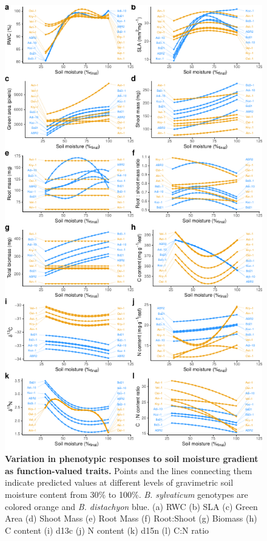\documentclass[jou,floatsintext]{apa6}
\begin{document}
\begin{figure}[!h]
\includegraphics[width=\textwidth]{../Figures/curves_byspecies} \caption{\textbf{Variation in phenotypic responses to soil moisture gradient as function-valued traits.} Points and the lines connecting them indicate predicted values at different levels of gravimetric soil moisture content from 30\% to 100\%. \emph{B. sylvaticum} genotypes are colored orange and \emph{B. distachyon} blue. (a) RWC (b) SLA (c) Green Area (d) Shoot Mass (e) Root Mass (f) Root:Shoot (g) Biomass (h) C content (i) d13c (j) N content (k) d15n (l) C:N ratio}\label{fig:curves}
\end{figure}
\end{document}
